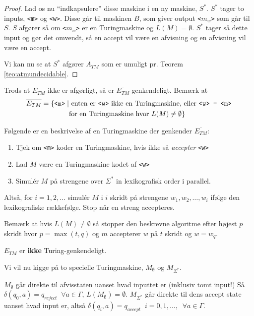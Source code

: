 \begin{proof}
	Lad os nu ``indkapsulere'' disse maskine i en ny maskine, $S^{*}$. $S^{*}$ tager to inputs, \texttt{<m>} og \texttt{<w>}. Disse går til maskinen $B$, som giver output \texttt{<$m_{w}$>} som går til $S$. $S$ afgører så om \texttt{<$m_{w}$>} er en Turingmaskine og $L(M) = \emptyset$. $S^{*}$ tager så dette input og gør det omvendt, så en accept vil være en afvisning og en afvisning vil være en accept.

	Vi kan nu se at $S^{*}$ afgører $A_{TM}$ som er umuligt pr. Teorem \ref{teo:atmundecidable}.
\end{proof}

Trods at $E_{TM}$ ikke er afgørligt, så er $\overline{E_{TM}}$ genkendeligt. Bemærk at
\begin{align*}
	\overline{E_{TM}} = \{  \text{\texttt{<m>}} \mid & \text{  enten er \texttt{<w>}  ikke en Turingmaskine, eller \texttt{<w> = <m>}} \\
	                                                 & \text{for en Turingmaskine hvor } L(M) \ne \emptyset\}
\end{align*}

Følgende er en beskrivelse af en Turingmaskine der genkender $\overline{E_{TM}}$:
\begin{enumerate}
	\item Tjek om \texttt{<m>} koder en Turingmaskine, hvis ikke så \textit{accepter} \texttt{<w>}
	\item Lad $M$ være en Turingmaskine kodet af \texttt{<w>}
	\item Simulér $M$ på strengene over $\Sigma^{*}$ in lexikografisk order i parallel.
\end{enumerate}

Altså, for $i = 1, 2, \ldots$ simulér $M$ i $i$ skridt på strengene $w_{1}, w_{2} , \ldots, w_{i}$ ifølge den lexikografiske rækkefølge. Stop når en streng accepteres.

Bemærk at hvis $L(M) \neq \emptyset$ så stopper den beskrevne algoritme efter højest $p$ skridt hvor $p = \max (t,q)$ og $m$ accepterer $w$ på $t$ skridt og $w = w_{q}$.

\begin{corollary}
	$E_{TM}$ er \textbf{ikke} Turing-genkendeligt.
\end{corollary}

Vi vil nu kigge på to specielle Turingmaskine, $M_{\emptyset}$ og $M_{\Sigma^{*}}$.

$M_{\emptyset}$ går direkte til afvisstaten uanset hvad inputtet er (inklusiv tomt input!) Så $\delta(q_{0}, a) = q_{reject} \;\; \forall a \in \Gamma$, $L(M_{\emptyset}) = \emptyset$.
$M_{\Sigma^{*}}$ går direkte til dens accept state uanset hvad input er, altså $\delta(q_{i}, a) = q_{accept} \;\; i = 0, 1, \ldots, \; \; \forall a \in \Gamma$.

